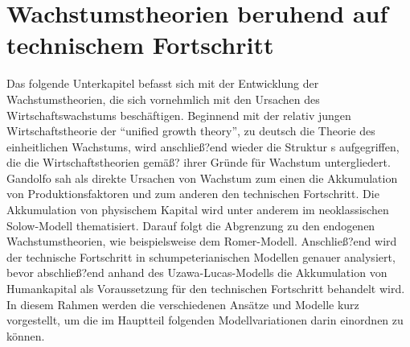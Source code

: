 \section[Wachstumstheorien beruhend auf technischem Fortschritt]{Wachstumstheorien beruhend auf\\ technischem Fortschritt }\label{sec:Wachstumstheorien}
%
Das folgende Unterkapitel befasst sich mit der Entwicklung der Wachstumstheorien, die sich vornehmlich mit den Ursachen des Wirtschaftswachstums beschäftigen. Beginnend mit der relativ jungen Wirtschaftstheorie der "`unified growth theory"', zu deutsch die Theorie des einheitlichen Wachstums, wird anschließ?end wieder die Struktur \cite{Gandolfo.1998}s aufgegriffen, die die Wirtschaftstheorien gemäß? ihrer Gründe für Wachstum untergliedert. Gandolfo sah als direkte Ursachen von Wachstum zum einen die Akkumulation von Produktionsfaktoren und zum anderen den technischen Fortschritt. Die Akkumulation von physischem Kapital wird unter anderem im neoklassischen Solow-Modell thematisiert. Darauf folgt die Abgrenzung zu den endogenen Wachstumstheorien, wie beispielsweise dem Romer-Modell. Anschließ?end wird der technische Fortschritt in schumpeterianischen Modellen genauer analysiert, bevor abschließ?end anhand des Uzawa-Lucas-Modells die Akkumulation von Humankapital als Voraussetzung für den technischen Fortschritt behandelt wird. \\
In diesem Rahmen werden die verschiedenen Ansätze und Modelle kurz vorgestellt, um die im Hauptteil folgenden Modellvariationen darin einordnen zu können. 
%

